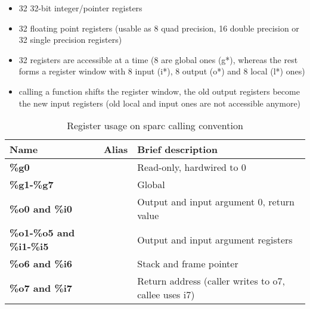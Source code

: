 \begin{itemize}
\item 32 32-bit integer/pointer registers
\item 32 floating point registers (usable as 8 quad precision, 16 double precision or 32 single precision registers)
\item 32 registers are accessible at a time (8 are global ones (g*), whereas the rest forms a register window with 8 input (i*), 8 output (o*) and 8 local (l*) ones)
\item calling a function shifts the register window, the old output registers become the new input registers (old local and input ones are not accessible anymore)
\end{itemize}

\begin{table}[h]
\begin{tabular*}{0.95\textwidth}{lll}
Name                                 & Alias                   & Brief description\\
\hline
{\bf \%g0}                           &                         & Read-only, hardwired to 0 \\
{\bf \%g1-\%g7}                      &                         & Global \\
{\bf \%o0 and \%i0}                  &                         & Output and input argument 0, return value \\
{\bf \%o1-\%o5 and \%i1-\%i5}        &                         & Output and input argument registers \\
{\bf \%o6 and \%i6}                  &                         & Stack and frame pointer \\
{\bf \%o7 and \%i7}                  &                         & Return address (caller writes to o7, callee uses i7) \\
\end{tabular*}
\caption{Register usage on sparc calling convention}
\end{table}

